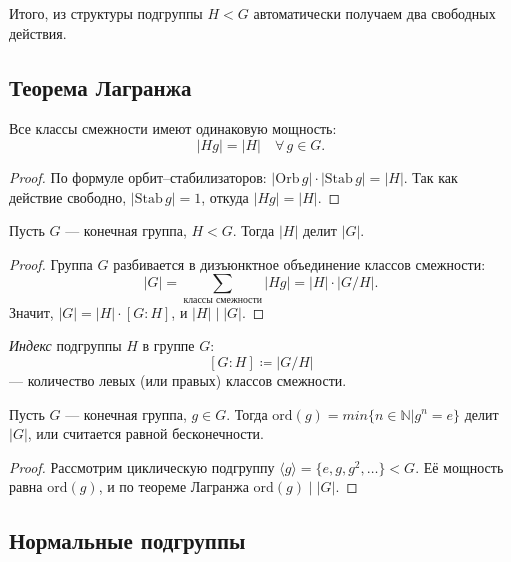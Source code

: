 Итого, из структуры подгруппы $H < G$ автоматически получаем два свободных действия.

\subsection*{Теорема Лагранжа}

\begin{stmt}
    Все классы смежности имеют одинаковую мощность:
    \[
        |Hg| = |H| \quad \forall\, g \in G.
    \]
    \begin{proof}
        По формуле орбит--стабилизаторов: $|\mathrm{Orb}\, g| \cdot |\mathrm{Stab}\, g| = |H|$.
        Так как действие свободно, $|\mathrm{Stab}\, g| = 1$, откуда $|Hg| = |H|$.
    \end{proof}
\end{stmt}

\begin{theorem}[Лагранжа]
    Пусть $G$ --- конечная группа, $H < G$. Тогда $|H|$ делит $|G|$.

    \begin{proof}
        Группа $G$ разбивается в дизъюнктное объединение классов смежности:
        \[
            |G| = \sum_{\text{классы смежности}} |Hg| = |H| \cdot |G / H|.
        \]
        Значит, $|G| = |H| \cdot [G : H]$, и $|H| \mid |G|$.
    \end{proof}
\end{theorem}

\begin{definition}
    \emph{Индекс} подгруппы $H$ в группе $G$:
    \[
        [G : H] \coloneqq |G / H|
    \]
    --- количество левых (или правых) классов смежности.
\end{definition}

\begin{cor}
    Пусть $G$ --- конечная группа, $g \in G$. Тогда $\mathrm{ord}(g) = min \{n \in \mathbb{N} | g^n = e\}$ делит $|G|$, или считается равной бесконечности.

    \begin{proof}
        Рассмотрим циклическую подгруппу $\langle g \rangle = \{e, g, g^2, \ldots\} < G$.
        Её мощность равна $\mathrm{ord}(g)$, и по теореме Лагранжа $\mathrm{ord}(g) \mid |G|$.
    \end{proof}
\end{cor}


\subsection*{Нормальные подгруппы}

